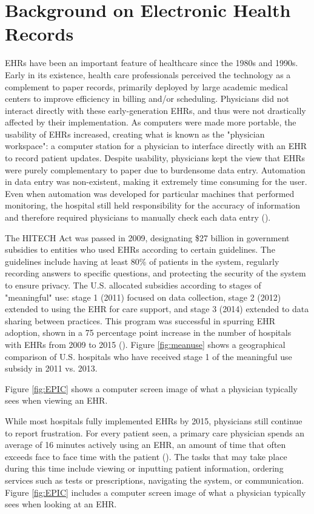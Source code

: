 \documentclass[11pt]{article}
\begin{document}
\section{Background on Electronic Health Records}

EHRs have been an important feature of healthcare since the 1980s and 1990s. Early in its existence, health care professionals perceived the technology as a complement to paper records, primarily deployed by large academic medical centers to improve efficiency in billing and/or scheduling. Physicians did not interact directly with these early-generation EHRs, and thus were not drastically affected by their implementation. As computers were made more portable, the usability of EHRs increased, creating what is known as the "physician workspace": a computer station for a physician to interface directly with an EHR to record patient updates. Despite usability, physicians kept the view that EHRs were purely complementary to paper due to burdensome data entry. Automation in data entry was non-existent, making it extremely time consuming for the user. Even when automation was developed for particular machines that performed monitoring, the hospital still held responsibility for the accuracy of information and therefore required physicians to manually check each data entry (\cite{evans2016electronic}). 

The HITECH Act was passed in 2009, designating \$27 billion in government subsidies to entities who used EHRs according to certain guidelines. The guidelines include having at least 80\% of patients in the system, regularly recording answers to specific questions, and protecting the security of the system to ensure privacy. The U.S. allocated subsidies according to stages of "meaningful" use: stage 1 (2011) focused on data collection, stage 2 (2012) extended to using the EHR for care support, and stage 3 (2014) extended to data sharing between practices. This program was successful in  spurring EHR adoption, shown in a 75 percentage point increase in the number of hospitals with EHRs from 2009 to 2015 (\cite{stats}). Figure \ref{fig:meanuse} shows a geographical comparison of U.S. hospitals who have received stage 1 of the meaningful use subsidy in 2011 vs. 2013. 

Figure \ref{fig:EPIC} shows a computer screen image of what a physician typically sees when viewing an EHR.


While most hospitals fully implemented EHRs by 2015, physicians still continue to report frustration. For every patient seen, a primary care physician spends an average of 16 minutes actively using an EHR, an amount of time that often exceeds face to face time with the patient (\cite{overhage2020physician}). The tasks that may take place during this time include viewing or inputting patient information, ordering services such as tests or prescriptions, navigating the system, or communication. Figure \ref{fig:EPIC} includes a computer screen image of what a physician typically sees when looking at an EHR. 
\end{document}
